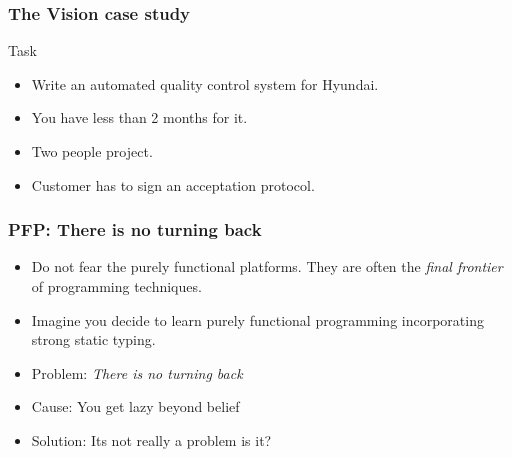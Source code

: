 \documentclass[11pt]{beamer}
\begin{document}
\begin{frame}
	\frametitle{The Vision case study}
	 {
	    \begin{block}{Task}
	    \begin{itemize}[<+->]
	    	\item Write an automated quality control system for Hyundai.
	    	\item You have less than 2 months for it.
	    	\item Two people project.
	    	\item Customer has to sign an acceptation protocol.
	    \end{itemize}
	    \end{block}
   	}
\end{frame}

\begin{frame}
	\frametitle{PFP: There is no turning back}
	\begin{itemize}[<+->]
		\item Do not fear the purely functional platforms. They are often the \textit{final frontier} of programming techniques.
		\item Imagine you decide to learn purely functional programming incorporating strong static typing.
		\item Problem: \textit{There is no turning back}
		\item Cause: You get lazy beyond belief
		\item Solution: Its not really a problem is it?
	\end{itemize}
\end{frame}
\end{document}

